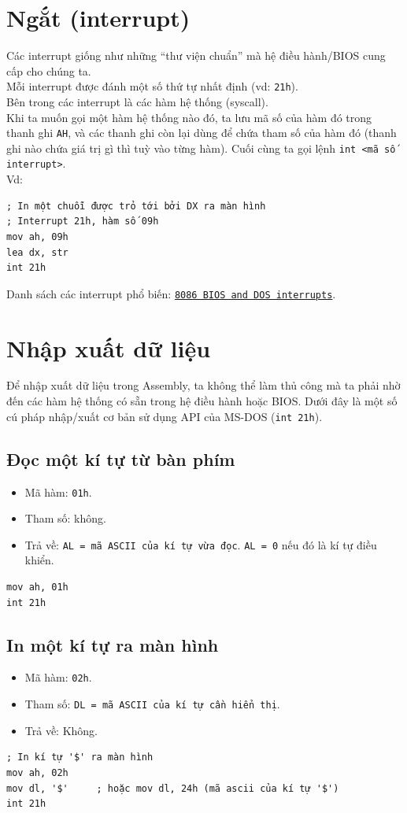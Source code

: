 \documentclass[12pt]{report}
\newcommand{\code}[1]{\texttt{#1}}
\begin{document}
\section{Ngắt (interrupt)}
Các interrupt giống như những ``thư viện chuẩn'' mà hệ điều hành/BIOS cung cấp cho chúng ta. \\
Mỗi interrupt được đánh một số thứ tự nhất định (vd: \code{21h}).\\
Bên trong các interrupt là các hàm hệ thống (syscall).\\
Khi ta muốn gọi một hàm hệ thống nào đó, ta lưu mã số của hàm đó trong thanh ghi \code{AH}, và các thanh ghi còn lại dùng để chứa tham số của hàm đó (thanh ghi nào chứa giá trị gì thì tuỳ vào từng hàm). Cuối cùng ta gọi lệnh \code{int <mã số interrupt>}.\\
Vd:
\begin{verbatim}
; In một chuỗi được trỏ tới bởi DX ra màn hình 
; Interrupt 21h, hàm số 09h
mov ah, 09h 
lea dx, str 
int 21h
\end{verbatim} 
Danh sách các interrupt phổ biến: \href{https://jbwyatt.com/253/emu/8086_bios_and_dos_interrupts.html}{\code{8086 BIOS and DOS interrupts}}.

\section{Nhập xuất dữ liệu}
Để nhập xuất dữ liệu trong Assembly, ta không thể làm thủ công mà ta phải nhờ đến các hàm hệ thống có sẵn trong hệ điều hành hoặc BIOS. Dưới đây là một số cú pháp nhập/xuất cơ bản sử dụng API của MS-DOS (\code{int 21h}).

\subsection{Đọc một kí tự từ bàn phím}
\begin{itemize}
    \item Mã hàm: \code{01h}.
    \item Tham số: không.
    \item Trả về: \code{AL = mã ASCII của kí tự vừa đọc}. \code{AL = 0} nếu đó là kí tự điều khiển.
\end{itemize}
\begin{verbatim}
mov ah, 01h 
int 21h
\end{verbatim}

\subsection{In một kí tự ra màn hình}
\begin{itemize}
    \item Mã hàm: \code{02h}.
    \item Tham số: \code{DL = mã ASCII của kí tự cần hiển thị}.
    \item Trả về: Không.
\end{itemize}
\begin{verbatim}
; In kí tự '$' ra màn hình 
mov ah, 02h 
mov dl, '$'     ; hoặc mov dl, 24h (mã ascii của kí tự '$')
int 21h
\end{verbatim}
\end{document}
